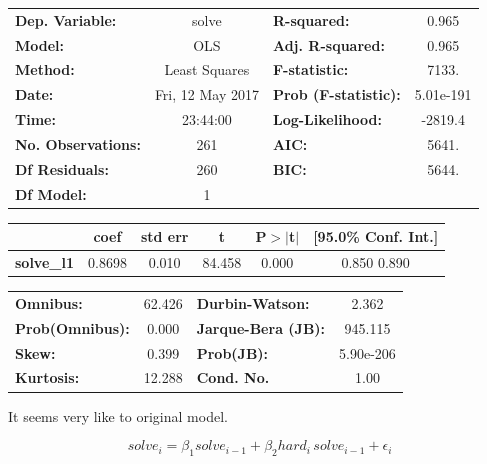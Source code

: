 \documentclass{article}
\begin{document}
\begin{center}
\begin{tabular}{lclc}
\toprule
\textbf{Dep. Variable:}    &      solve       & \textbf{  R-squared:         } &     0.965   \\
\textbf{Model:}            &       OLS        & \textbf{  Adj. R-squared:    } &     0.965   \\
\textbf{Method:}           &  Least Squares   & \textbf{  F-statistic:       } &     7133.   \\
\textbf{Date:}             & Fri, 12 May 2017 & \textbf{  Prob (F-statistic):} & 5.01e-191   \\
\textbf{Time:}             &     23:44:00     & \textbf{  Log-Likelihood:    } &   -2819.4   \\
\textbf{No. Observations:} &         261      & \textbf{  AIC:               } &     5641.   \\
\textbf{Df Residuals:}     &         260      & \textbf{  BIC:               } &     5644.   \\
\textbf{Df Model:}         &           1      & \textbf{                     } &             \\
\bottomrule
\end{tabular}
\begin{tabular}{lccccc}
                  & \textbf{coef} & \textbf{std err} & \textbf{t} & \textbf{P$>$$|$t$|$} & \textbf{[95.0\% Conf. Int.]}  \\
\midrule
\textbf{solve\_l1} &       0.8698  &        0.010     &    84.458  &         0.000        &         0.850     0.890       \\
\bottomrule
\end{tabular}
\begin{tabular}{lclc}
\textbf{Omnibus:}       & 62.426 & \textbf{  Durbin-Watson:     } &     2.362  \\
\textbf{Prob(Omnibus):} &  0.000 & \textbf{  Jarque-Bera (JB):  } &   945.115  \\
\textbf{Skew:}          &  0.399 & \textbf{  Prob(JB):          } & 5.90e-206  \\
\textbf{Kurtosis:}      & 12.288 & \textbf{  Cond. No.          } &      1.00  \\
\bottomrule
\end{tabular}
\end{center}


It seems very like to original model.

\[
solve_i = \beta_1 solve_{i-1} + \beta_2 hard_i \, solve_{i-1} + \epsilon_i
\]
\end{document}
